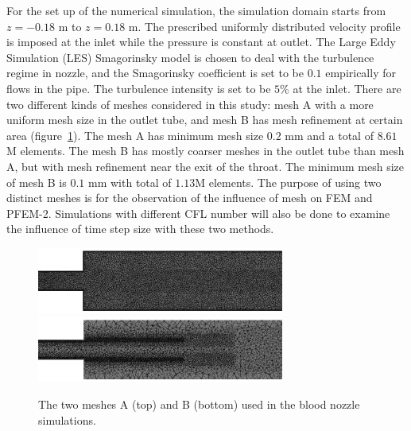 For the set up of the numerical simulation, the simulation domain starts from $z=-0.18$ m to $z=0.18$ m. The prescribed uniformly distributed velocity profile is imposed at the inlet while the pressure is constant at outlet. The Large Eddy Simulation (LES) Smagorinsky model is chosen to deal with the turbulence regime in nozzle, and the Smagorinsky coefficient is set to be $0.1$ empirically for flows in the pipe. The turbulence intensity is set to be $5$\% at the inlet. There are two different kinds of meshes considered in this study: mesh A with a more uniform mesh size in the outlet tube, and mesh B has mesh refinement at certain area (figure~\ref{fig:nozzlemesh}). The mesh A has minimum mesh size $0.2$ mm and a total of $8.61$M elements. The mesh B has mostly coarser meshes in the outlet tube than mesh A, but with mesh refinement near the exit of the throat. The minimum mesh size of mesh B is $0.1$ mm with total of $1.13$M elements. The purpose of using two distinct meshes is for the observation of the influence of mesh on FEM and PFEM-2. Simulations with different CFL number will also be done to examine the influence of time step size with these two methods.

\begin{figure}[htbp]
    \centering
    \includegraphics[width=3.2in]{imgs/nozzle_pump/nozzle_fmesh.pdf}
    \includegraphics[width=3.2in]{imgs/nozzle_pump/nozzle_pmesh.pdf}
    \caption{The two meshes A (top) and B (bottom) used in the blood nozzle simulations.}
    \label{fig:nozzlemesh}
\end{figure}


